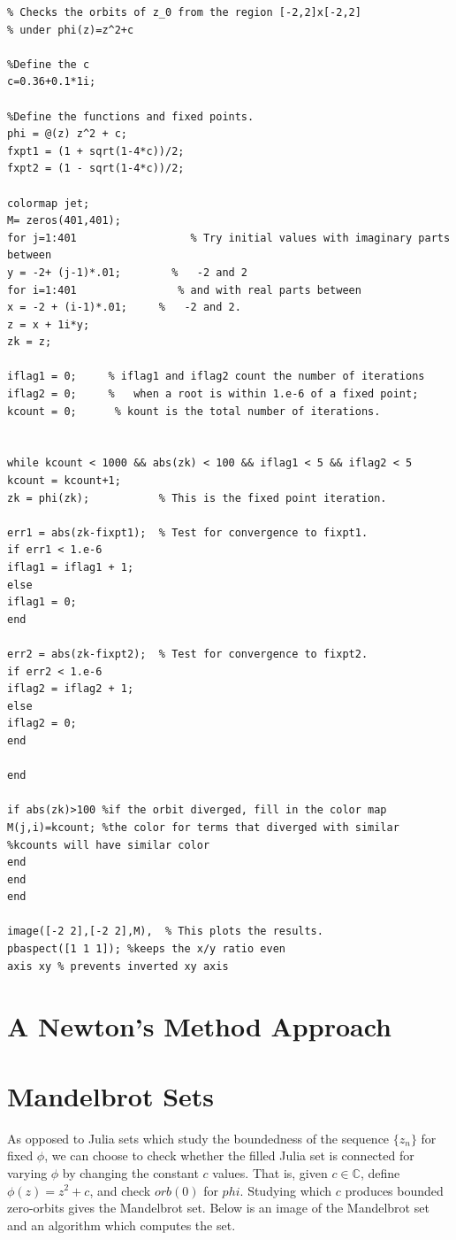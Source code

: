 \documentclass[12pt]{article}
\def\C{\mathbb{C}}
\begin{document}
    \begin{verbatim}
% Checks the orbits of z_0 from the region [-2,2]x[-2,2]
% under phi(z)=z^2+c

%Define the c
c=0.36+0.1*1i;

%Define the functions and fixed points.
phi = @(z) z^2 + c;
fxpt1 = (1 + sqrt(1-4*c))/2;
fxpt2 = (1 - sqrt(1-4*c))/2;

colormap jet;
M= zeros(401,401);
for j=1:401                  % Try initial values with imaginary parts between
y = -2+ (j-1)*.01;        %   -2 and 2
for i=1:401                % and with real parts between
x = -2 + (i-1)*.01;     %   -2 and 2.
z = x + 1i*y;
zk = z;

iflag1 = 0;     % iflag1 and iflag2 count the number of iterations
iflag2 = 0;     %   when a root is within 1.e-6 of a fixed point;
kcount = 0;      % kount is the total number of iterations.


while kcount < 1000 && abs(zk) < 100 && iflag1 < 5 && iflag2 < 5
kcount = kcount+1;
zk = phi(zk);           % This is the fixed point iteration.

err1 = abs(zk-fixpt1);  % Test for convergence to fixpt1.
if err1 < 1.e-6
iflag1 = iflag1 + 1;
else
iflag1 = 0;
end

err2 = abs(zk-fixpt2);  % Test for convergence to fixpt2.
if err2 < 1.e-6
iflag2 = iflag2 + 1;
else
iflag2 = 0;
end

end

if abs(zk)>100 %if the orbit diverged, fill in the color map
M(j,i)=kcount; %the color for terms that diverged with similar
%kcounts will have similar color
end
end
end

image([-2 2],[-2 2],M),  % This plots the results.
pbaspect([1 1 1]); %keeps the x/y ratio even
axis xy % prevents inverted xy axis
\end{verbatim}


\section{A Newton's Method Approach}

\section{Mandelbrot Sets}
As opposed to Julia sets which study the boundedness of the sequence $\{z_n\}$ for fixed $\phi$, we can choose to check whether the filled Julia set is connected for varying $\phi$ by changing the constant $c$ values. That is, given $c\in \C$, define $\phi(z)=z^2+c$, and check $orb(0)$ for $phi$. Studying which $c$ produces bounded zero-orbits gives the Mandelbrot set. Below is an image of the Mandelbrot set and an algorithm which computes the set. \\
 
\end{document}
